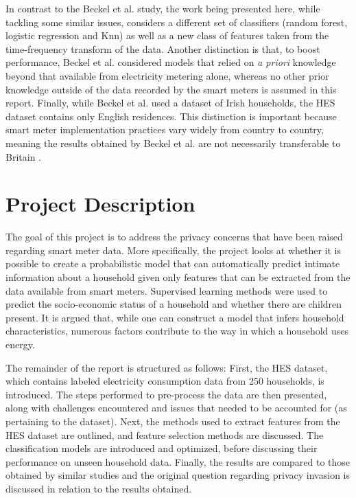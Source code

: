 In contrast to the Beckel et al. study, the work being presented here, while tackling some similar issues, considers a different set of classifiers (random forest, logistic regression and Knn) as well as a new class of features taken from the time-frequency transform of the data. Another distinction is that, to boost performance, Beckel et al. considered models that relied on \textit{a priori} knowledge beyond that available from electricity metering alone, whereas no other prior knowledge outside of the data recorded by the smart meters is assumed in this report. Finally, while Beckel et al. used a dataset of Irish households, the HES dataset contains only English residences. This distinction is important because smart meter implementation practices vary widely from country to country, meaning the results obtained by Beckel et al. are not necessarily transferable to Britain \cite{Anderson,Wilhite}. 




\section{Project Description}
The goal of this project is to address the privacy concerns that have been raised regarding smart meter data. More specifically, the project looks at whether it is possible to create a probabilistic model that can automatically predict intimate information about a household given only features that can be extracted from the data available from smart meters. Supervised learning methods were used to predict the socio-economic status of a household and whether there are children present. It is argued that, while one can construct a model that infers household characteristics, numerous factors contribute to the way in which a household uses energy.

The remainder of the report is structured as follows:
First, the HES dataset, which contains labeled electricity consumption data from 250 households, is introduced.   The steps performed to pre-process the data are then presented, along with challenges encountered and issues that needed to be accounted for (as pertaining to the dataset). Next, the methods used to extract features from the HES dataset are outlined, and feature selection methods are discussed.  The classification models are introduced and optimized, before discussing their performance on unseen household data. Finally, the results are compared to those obtained by similar studies and the original question regarding privacy invasion is discussed in relation to the results obtained.